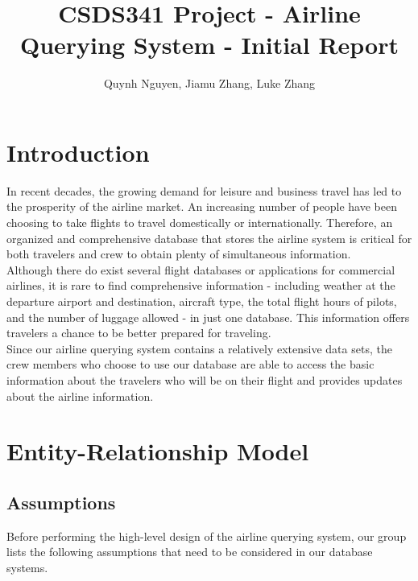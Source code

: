 \documentclass{article}
\title{CSDS341 Project - Airline Querying System - Initial Report}
\author{Quynh Nguyen, Jiamu Zhang, Luke Zhang}
\begin{document}
	
	
	\maketitle
	
	\section{Introduction}
	
	\noindent In recent decades, the growing demand for leisure and business travel has led to the prosperity of the airline market. An increasing number of people have been choosing to take flights to travel domestically or internationally. Therefore, an organized and comprehensive database that stores the airline system is critical for both travelers and crew to obtain plenty of simultaneous information.\\
	
	\noindent Although there do exist several flight databases or applications for commercial airlines, it is rare to find comprehensive information - including weather at the departure airport and destination, aircraft type, the total flight hours of pilots, and the number of luggage allowed - in just one database. This information offers travelers a chance to be better prepared for traveling.\\
	
	\noindent Since our airline querying system contains a relatively extensive data sets, the crew members who choose to use our database are able to access the basic information about the travelers who will be on their flight and provides updates about the airline information. 	
	
	\section{Entity-Relationship Model}
	
	\subsection{Assumptions}
	{Before performing the high-level design of the airline querying system, our group lists the following assumptions that need to be considered in our database systems.}
	
\end{document}
